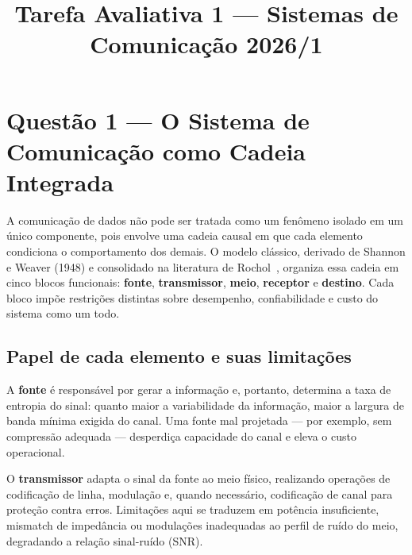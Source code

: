 \documentclass[conference]{IEEEtran}
\begin{document}
\title{Tarefa Avaliativa 1 --- Sistemas de Comunicação 2026/1}

\author{
}

\maketitle

\section*{Questão 1 — O Sistema de Comunicação como Cadeia Integrada}

A comunicação de dados não pode ser tratada como um fenômeno isolado em um único componente,
pois envolve uma cadeia causal em que cada elemento condiciona o comportamento dos demais.
O modelo clássico, derivado de Shannon e Weaver (1948) e consolidado na literatura de Rochol~\cite{rochol2012},
organiza essa cadeia em cinco blocos funcionais: \textbf{fonte}, \textbf{transmissor}, \textbf{meio},
\textbf{receptor} e \textbf{destino}. Cada bloco impõe restrições distintas sobre desempenho,
confiabilidade e custo do sistema como um todo.

\subsection*{Papel de cada elemento e suas limitações}

A \textbf{fonte} é responsável por gerar a informação e, portanto, determina a taxa de entropia
do sinal: quanto maior a variabilidade da informação, maior a largura de banda mínima exigida
do canal. Uma fonte mal projetada --- por exemplo, sem compressão adequada --- desperdiça
capacidade do canal e eleva o custo operacional.

O \textbf{transmissor} adapta o sinal da fonte ao meio físico, realizando operações de
codificação de linha, modulação e, quando necessário, codificação de canal para proteção contra
erros. Limitações aqui se traduzem em potência insuficiente, mismatch de impedância ou
modulações inadequadas ao perfil de ruído do meio, degradando a relação sinal-ruído (SNR).
\end{document}
